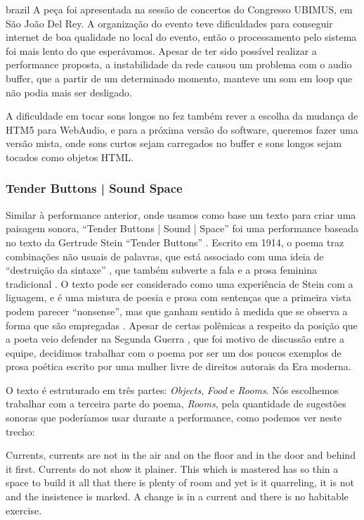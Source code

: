 \begin{otherlanguage*}{brazil}
A peça foi apresentada na sessão de concertos do Congresso UBIMUS, em São João Del Rey. A organização do evento teve dificuldades para conseguir internet de boa qualidade no local do evento, então o processamento pelo sistema foi mais lento do que esperávamos. Apesar de ter sido possível realizar a performance proposta, a instabilidade da rede causou um problema com o audio buffer, que a partir de um determinado momento, manteve um som em loop que não podia mais ser desligado.

A dificuldade em tocar sons longos no fez também rever a escolha da mudança de HTM5 para WebAudio, e para a próxima versão do software, queremos fazer uma versão mista, onde sons curtos sejam carregados no buffer e sons longos sejam tocados como objetos HTML.


\subsubsection{Tender Buttons | Sound Space}
Similar à performance anterior, onde usamos como base um texto para criar uma paisagem sonora, ``Tender Buttons | Sound | Space''  foi uma performance baseada no texto da Gertrude Stein ``Tender Buttons'' \cite{Stein1914}. Escrito em 1914, o poema traz combinações não usuais de palavras, que está associado com uma ideia de ``destruição da sintaxe'' \cite{Perloff1996}, que também subverte a fala e a prosa feminina tradicional \cite{Murphy1991}. O texto pode ser considerado como uma experiência de Stein com a liguagem, e é uma mistura de poesia e prosa com sentenças que a primeira vista podem parecer ``nonsense'', mas que ganham sentido à medida que se observa a forma que são empregadas \cite{Perloff1996}. Apesar de certas polêmicas a respeito da posição que a poeta veio defender na Segunda Guerra \cite{Bernstein2012}, que foi motivo de discussão entre a equipe, decidimos trabalhar com o poema por ser um dos poucos exemplos de prosa poética escrito por uma mulher livre de direitos autorais da Era moderna.

O texto é estruturado em três partes: \textit{Objects}, \textit{Food} e \textit{Rooms}. Nós escolhemos trabalhar com a terceira parte do poema, \textit{Rooms}, pela quantidade de sugestões sonoras que poderíamos usar durante a performance, como podemos ver neste trecho:

\begin{citacao}
Currents, currents are not in the air and on the floor and in the door and behind it first. Currents do not show it plainer. This which is mastered has so thin a space to build it all that there is plenty of room and yet is it quarreling, it is not and the insistence is marked. A change is in a current and there is no habitable exercise. \cite{Stein1914}
\end{citacao} 


\end{otherlanguage*}
